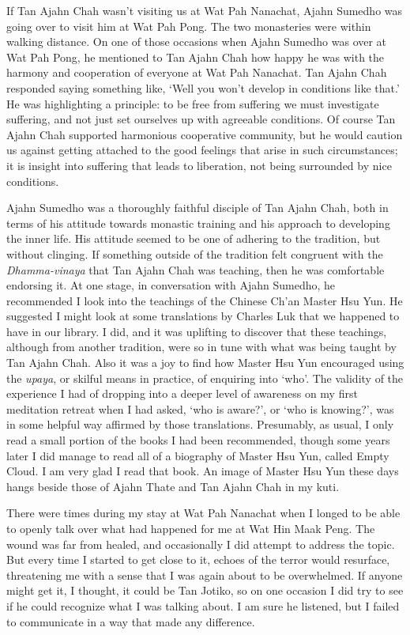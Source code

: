 If Tan Ajahn Chah wasn't visiting us at Wat Pah Nanachat, Ajahn Sumedho
was going over to visit him at Wat Pah Pong. The two monasteries were
within walking distance. On one of those occasions when Ajahn Sumedho
was over at Wat Pah Pong, he mentioned to Tan Ajahn Chah how happy he
was with the harmony and cooperation of everyone at Wat Pah Nanachat.
Tan Ajahn Chah responded saying something like, `Well you won't develop
in conditions like that.' He was highlighting a principle: to be free
from suffering we must investigate suffering, and not just set ourselves
up with agreeable conditions. Of course Tan Ajahn Chah supported
harmonious cooperative community, but he would caution us against
getting attached to the good feelings that arise in such circumstances;
it is insight into suffering that leads to liberation, not being
surrounded by nice conditions.

Ajahn Sumedho was a thoroughly faithful disciple of Tan Ajahn Chah, both
in terms of his attitude towards monastic training and his approach to
developing the inner life. His attitude seemed to be one of adhering to
the tradition, but without clinging. If something outside of the
tradition felt congruent with the \emph{Dhamma-vinaya} that Tan Ajahn
Chah was teaching, then he was comfortable endorsing it. At one stage,
in conversation with Ajahn Sumedho, he recommended I look into the
teachings of the Chinese Ch'an Master Hsu Yun\cite{hsu-yun}.
He suggested I might look at some translations by Charles Luk that we happened to have in our library. I did, and it was uplifting
to discover that these teachings, although from another tradition, were
so in tune with what was being taught by Tan Ajahn Chah. Also it was a
joy to find how Master Hsu Yun encouraged using the \emph{upaya}, or
skilful means in practice, of enquiring into `who'. The validity of the
experience I had of dropping into a deeper level of awareness on my
first meditation retreat when I had asked, `who is aware?', or `who is
knowing?', was in some helpful way affirmed by those translations.
Presumably, as usual, I only read a small portion of the books I had
been recommended, though some years later I did manage to read all of a
biography of Master Hsu Yun, called Empty Cloud\cite{hsu-yun-bio}.
I am very glad I read that book. An image of Master Hsu Yun
these days hangs beside those of Ajahn Thate and Tan Ajahn
Chah in my kuti.

There were times during my stay at Wat Pah Nanachat when I longed to be
able to openly talk over what had happened for me at Wat Hin Maak Peng.
The wound was far from healed, and occasionally I did attempt to address
the topic. But every time I started to get close to it, echoes of the
terror would resurface, threatening me with a sense that I was again
about to be overwhelmed. If anyone might get it, I thought, it could be
Tan Jotiko, so on one occasion I did try to see if he could recognize
what I was talking about. I am sure he listened, but I failed to
communicate in a way that made any difference.

